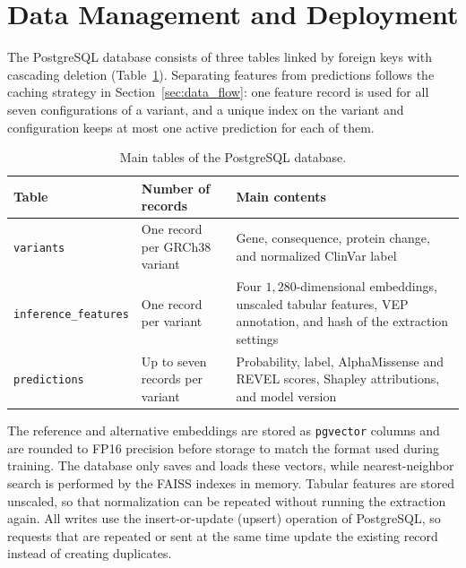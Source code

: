 \section{Data Management and Deployment}
\label{sec:db_deployment}

The PostgreSQL database consists of three tables linked by foreign keys with cascading deletion (Table~\ref{tab:db_schema}). Separating features from predictions follows the caching strategy in Section~\ref{sec:data_flow}: one feature record is used for all seven configurations of a variant, and a unique index on the variant and configuration keeps at most one active prediction for each of them.

\begin{table}[htbp]
    \centering
    \caption{Main tables of the PostgreSQL database.}
    \label{tab:db_schema}
    \begin{tabular}{lp{}p{}}
        \toprule
        \textbf{Table} & \textbf{Number of records} & \textbf{Main contents} \\
        \midrule
        \texttt{variants} & One record per GRCh38 variant & Gene, consequence, protein change, and normalized ClinVar label \\
        \addlinespace
        \texttt{inference\_features} & One record per variant & Four $1{,}280$-dimensional embeddings, unscaled tabular features, VEP annotation, and hash of the extraction settings \\
        \addlinespace
        \texttt{predictions} & Up to seven records per variant & Probability, label, AlphaMissense and REVEL scores, Shapley attributions, and model version \\
        \bottomrule
    \end{tabular}
\end{table}

The reference and alternative embeddings are stored as \texttt{pgvector} columns and are rounded to FP16 precision before storage to match the format used during training. The database only saves and loads these vectors, while nearest-neighbor search is performed by the FAISS indexes in memory. Tabular features are stored unscaled, so that normalization can be repeated without running the extraction again. All writes use the insert-or-update (upsert) operation of PostgreSQL, so requests that are repeated or sent at the same time update the existing record instead of creating duplicates.

